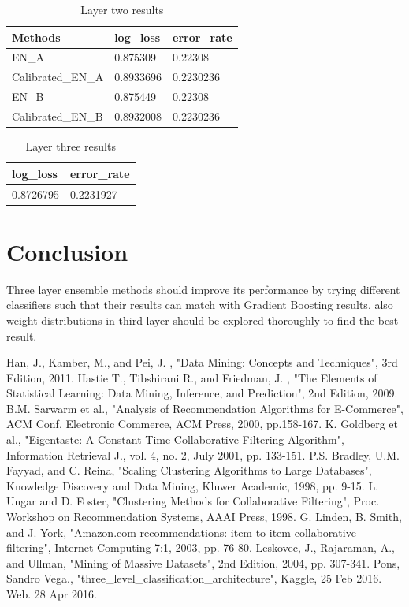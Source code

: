 \documentclass{sig-alternate-05-2015}
\begin{document}
\begin{table}[ht]
\centering
\caption{Layer two results}
\label{layer2}
\begin{tabular}{|l|l|l|}
\hline
Methods           & log\_loss & error\_rate \\ \hline
EN\_A             & 0.875309  & 0.22308     \\ \hline
Calibrated\_EN\_A & 0.8933696 & 0.2230236   \\ \hline
EN\_B             & 0.875449  & 0.22308     \\ \hline
Calibrated\_EN\_B & 0.8932008 & 0.2230236   \\ \hline
\end{tabular}
\end{table}

\begin{table}[ht]
\centering
\caption{Layer three results}
\label{layer3}
\begin{tabular}{|l|l|}
\hline
log\_loss & error\_rate \\ \hline
0.8726795 & 0.2231927   \\ \hline
\end{tabular}
\end{table}

\FloatBarrier
\section{Conclusion}
Three layer ensemble methods should improve its performance by trying different classifiers such that their results can match with Gradient Boosting results, also weight distributions in third layer should be explored thoroughly to find the best result.

\medskip

\begin{thebibliography}{9}
 Han, J., Kamber, M., and Pei, J. , "Data Mining: Concepts and Techniques", 3rd Edition, 2011.
 Hastie T., Tibshirani R., and Friedman, J. , "The Elements of Statistical Learning: Data Mining, Inference, and Prediction", 2nd Edition, 2009.
 B.M. Sarwarm et al., "Analysis of Recommendation Algorithms for E-Commerce", ACM Conf. Electronic Commerce, ACM Press, 2000, pp.158-167.
 K. Goldberg et al., "Eigentaste: A Constant Time Collaborative Filtering Algorithm", Information Retrieval J., vol. 4, no. 2, July 2001, pp. 133-151.
 P.S. Bradley, U.M. Fayyad, and C. Reina, "Scaling Clustering Algorithms to Large Databases", Knowledge Discovery and Data Mining, Kluwer Academic, 1998, pp. 9-15.
 L. Ungar and D. Foster, "Clustering Methods for Collaborative Filtering", Proc. Workshop on Recommendation Systems, AAAI Press, 1998.
 G. Linden, B. Smith, and J. York, "Amazon.com recommendations: item-to-item collaborative filtering", Internet Computing 7:1, 2003, pp. 76-80.
 Leskovec, J., Rajaraman, A., and Ullman, "Mining of Massive Datasets", 2nd Edition, 2004, pp. 307-341.
 Pons, Sandro Vega., "three\_level\_classification\_architecture", Kaggle, 25 Feb 2016. Web. 28 Apr 2016.

\end{thebibliography}
\end{document}
